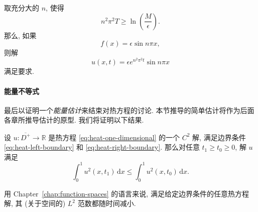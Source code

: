 \begin{Proof}
取充分大的 $n$, 使得
\begin{equation}\label{eq:backwards-frequency-choice}
n^2\pi^2T\geq\ln\left(\dfrac M\epsilon\right).
\end{equation}
那么, 如果
\begin{equation}\label{eq:backwards-sine-initial-data}
f(x)=\epsilon\sin n\pi x,
\end{equation}
则解
\begin{equation}\label{eq:backwards-growing-sine-solution}
u(x,t)=\epsilon e^{n^2\pi^2t}\sin n\pi x
\end{equation}
满足要求.
\end{Proof}

\paragraph*{能量不等式}

最后以证明一个\emph{能量估计}来结束对热方程的讨论. 本节推导的简单估计将作为后面各章所推导估计的原型. 我们将证明以下结果.

\begin{Lemma}
\label{lem:heat-energy-decay}
设 $u:\overline{D^+}\to\mathbb{R}$ 是热方程 \eqref{eq:heat-one-dimensional} 的一个 $C^2$ 解, 满足边界条件 \eqref{eq:heat-left-boundary} 和 \eqref{eq:heat-right-boundary}. 那么对任意 $t_1\geq t_0\geq0$, 解 $u$ 满足
\begin{equation}\label{eq:heat-energy-decay}
\int_0^1u^2(x,t_1)\,\mathrm{d}x\leq\int_0^1u^2(x,t_0)\,\mathrm{d}x.
\end{equation}

\end{Lemma}

用 Chapter~\ref{chap:function-spaces} 的语言来说, 满足给定边界条件的任意热方程解, 其 (关于空间的) $L^2$ 范数都随时间减小.

